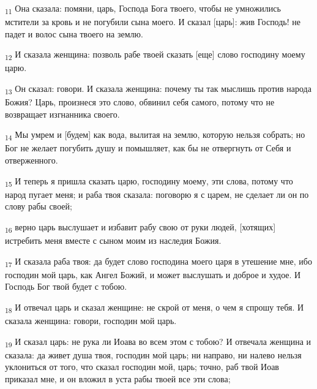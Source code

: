 \begin{tcolorbox}
\textsubscript{11} Она сказала: помяни, царь, Господа Бога твоего, чтобы не умножились мстители за кровь и не погубили сына моего. И сказал [царь]: жив Господь! не падет и волос сына твоего на землю.
\end{tcolorbox}
\begin{tcolorbox}
\textsubscript{12} И сказала женщина: позволь рабе твоей сказать [еще] слово господину моему царю.
\end{tcolorbox}
\begin{tcolorbox}
\textsubscript{13} Он сказал: говори. И сказала женщина: почему ты так мыслишь против народа Божия? Царь, произнеся это слово, обвинил себя самого, потому что не возвращает изгнанника своего.
\end{tcolorbox}
\begin{tcolorbox}
\textsubscript{14} Мы умрем и [будем] как вода, вылитая на землю, которую нельзя собрать; но Бог не желает погубить душу и помышляет, как бы не отвергнуть от Себя и отверженного.
\end{tcolorbox}
\begin{tcolorbox}
\textsubscript{15} И теперь я пришла сказать царю, господину моему, эти слова, потому что народ пугает меня; и раба твоя сказала: поговорю я с царем, не сделает ли он по слову рабы своей;
\end{tcolorbox}
\begin{tcolorbox}
\textsubscript{16} верно царь выслушает и избавит рабу свою от руки людей, [хотящих] истребить меня вместе с сыном моим из наследия Божия.
\end{tcolorbox}
\begin{tcolorbox}
\textsubscript{17} И сказала раба твоя: да будет слово господина моего царя в утешение мне, ибо господин мой царь, как Ангел Божий, и может выслушать и доброе и худое. И Господь Бог твой будет с тобою.
\end{tcolorbox}
\begin{tcolorbox}
\textsubscript{18} И отвечал царь и сказал женщине: не скрой от меня, о чем я спрошу тебя. И сказала женщина: говори, господин мой царь.
\end{tcolorbox}
\begin{tcolorbox}
\textsubscript{19} И сказал царь: не рука ли Иоава во всем этом с тобою? И отвечала женщина и сказала: да живет душа твоя, господин мой царь; ни направо, ни налево нельзя уклониться от того, что сказал господин мой, царь; точно, раб твой Иоав приказал мне, и он вложил в уста рабы твоей все эти слова;
\end{tcolorbox}
